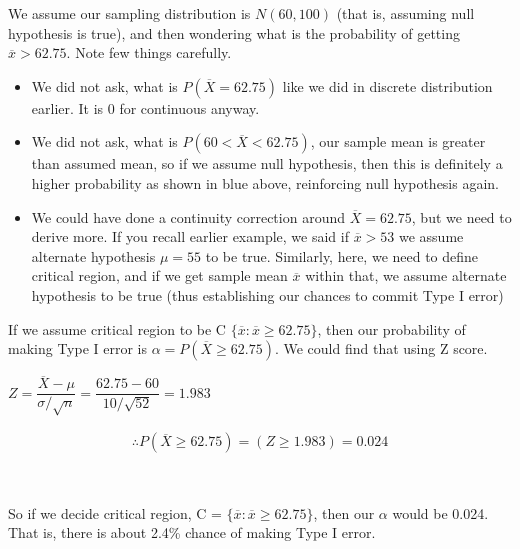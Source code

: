 \documentclass[float=false,crop=false]{standalone}
\begin{document}
    We assume our sampling distribution is \(N(60,100)\) (that is, assuming
null hypothesis is true), and then wondering what is the probability of
getting \(\overline{x} > 62.75\). Note few things carefully.

\begin{itemize}
\tightlist
\item
  We did not ask, what is \(P(\overline{X} = 62.75)\) like we did in
  discrete distribution earlier. It is 0 for continuous anyway.
\item
  We did not ask, what is \(P(60 < \overline{X} < 62.75)\), our sample
  mean is greater than assumed mean, so if we assume null hypothesis,
  then this is definitely a higher probability as shown in blue above,
  reinforcing null hypothesis again.
\item
  We could have done a continuity correction around
  \(\overline{X} = 62.75\), but we need to derive more. If you recall
  earlier example, we said if \(\overline{x} > 53\) we assume alternate
  hypothesis \(\mu = 55\) to be true. Similarly, here, we need to define
  critical region, and if we get sample mean \(\overline{x}\) within
  that, we assume alternate hypothesis to be true (thus establishing our
  chances to commit Type I error)
\end{itemize}

    If we assume critical region to be C
\(\{\overline{x}: \overline{x} \geq 62.75\}\), then our probability of
making Type I error is \(\alpha = P(\overline{X} \geq 62.75)\). We could
find that using Z score.

\(Z = \dfrac{\overline{X} - \mu}{\sigma/\sqrt{n}} = \dfrac{62.75 - 60}{10/\sqrt{52}} = 1.983\)

\begin{equation}
\begin{aligned}
    \therefore P(\overline{X} \geq 62.75) = (Z \geq 1.983) = 0.024 \label{eq:001}
\end{aligned}
\end{equation}
    \begin{center}
    \end{center}
    { \hspace*{\fill} \\}
    
    So if we decide critical region, C =
\(\{\overline{x}: \overline{x} \geq 62.75\}\), then our \(\alpha\) would
be 0.024. That is, there is about 2.4\% chance of making Type I error.
\end{document}
